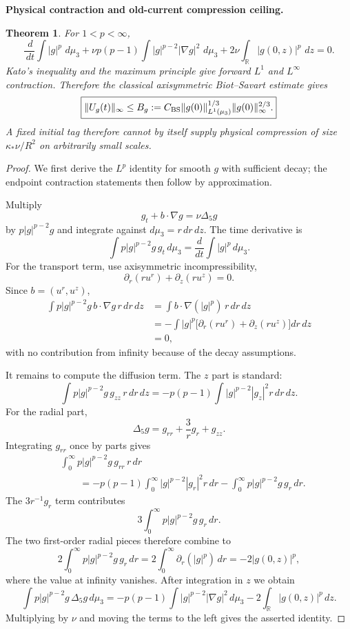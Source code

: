 \documentclass[11pt]{article}
\newtheorem{theorem}{Theorem}[section]
\theoremstyle{definition}\newtheorem{definition}[theorem]{Definition}
\theoremstyle{remark}\newtheorem{remark}[theorem]{Remark}
\newcommand{\R}{\mathbb R}\newcommand{\dd}{\,d}\newcommand{\HH}{\mathcal H}
\begin{document}
\medskip
\noindent\textbf{Physical contraction and old-current compression ceiling.}
\begin{theorem}\label{thm:oldceiling}
For $1<p<\infty$,
\[
\frac{\dd}{\dd t}\int|g|^p\,\dd\mu_3
+\nu p(p-1)\int|g|^{p-2}|\nabla g|^2\,\dd\mu_3
+2\nu\int_{\R}|g(0,z)|^p\,\dd z=0.
\]
Kato's inequality and the maximum principle give forward $L^1$ and $L^\infty$
contraction.  Therefore the classical axisymmetric Biot--Savart estimate gives
\[
\boxed{\|U_g(t)\|_\infty
\le B_g:=C_{\rm BS}\|g(0)\|_{L^1(\mu_3)}^{1/3}
\|g(0)\|_\infty^{2/3}.}
\]
A fixed initial tag therefore cannot by itself supply physical compression of
size $\kappa_*\nu/R^2$ on arbitrarily small scales.
\end{theorem}
\begin{proof}
We first derive the $L^p$ identity for smooth $g$ with sufficient decay; the endpoint contraction statements then follow by approximation.

Multiply
\[
 g_t+b\cdot\nabla g=\nu\Delta_5g
\]
by $p|g|^{p-2}g$ and integrate against $d\mu_3=r\,dr\,dz$.  The time derivative is
\[
 \int p|g|^{p-2}g\,g_t\,d\mu_3
 =\frac{d}{dt}\int |g|^p\,d\mu_3.
\]
For the transport term, use axisymmetric incompressibility,
\[
 \partial_r(ru^r)+\partial_z(ru^z)=0.
\]
Since $b=(u^r,u^z)$,
\[
 \begin{aligned}
 \int p|g|^{p-2}g\,b\cdot\nabla g\,r\,dr\,dz
 &=\int b\cdot\nabla(|g|^p)\,r\,dr\,dz\\
 &=-\int |g|^p\bigl[\partial_r(ru^r)+\partial_z(ru^z)\bigr]dr\,dz\\
 &=0,
 \end{aligned}
\]
with no contribution from infinity because of the decay assumptions.

It remains to compute the diffusion term.  The $z$ part is standard:
\[
 \int p|g|^{p-2}g\,g_{zz}\,r\,dr\,dz
 =-p(p-1)\int |g|^{p-2}|g_z|^2r\,dr\,dz.
\]
For the radial part,
\[
 \Delta_5g=g_{rr}+\frac3r g_r+g_{zz}.
\]
Integrating $g_{rr}$ once by parts gives
\[
 \begin{aligned}
 &\int_0^\infty p|g|^{p-2}g\,g_{rr}\,r\,dr\\
 &\qquad=-p(p-1)\int_0^\infty |g|^{p-2}|g_r|^2r\,dr
 -\int_0^\infty p|g|^{p-2}g\,g_r\,dr.
 \end{aligned}
\]
The $3r^{-1}g_r$ term contributes
\[
 3\int_0^\infty p|g|^{p-2}g\,g_r\,dr.
\]
The two first-order radial pieces therefore combine to
\[
 2\int_0^\infty p|g|^{p-2}g\,g_r\,dr
 =2\int_0^\infty \partial_r(|g|^p)\,dr
 =-2|g(0,z)|^p,
\]
where the value at infinity vanishes.  After integration in $z$ we obtain
\[
 \int p|g|^{p-2}g\,\Delta_5g\,d\mu_3
 =-p(p-1)\int |g|^{p-2}|\nabla g|^2\,d\mu_3
 -2\int_{\R}|g(0,z)|^p\,dz.
\]
Multiplying by $\nu$ and moving the terms to the left gives the asserted identity.


\end{proof}
\end{document}
